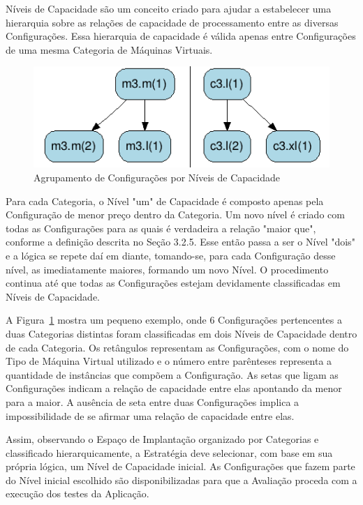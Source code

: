 Níveis de Capacidade são um conceito criado para ajudar a estabelecer uma hierarquia 
sobre as relações de capacidade de processamento entre as diversas Configurações. 
Essa hierarquia de capacidade é válida apenas entre Configurações de uma mesma 
Categoria de Máquinas Virtuais. 

\begin{figure}[hbt]
  \caption{\label{fig_niveis_capacidade}Agrupamento de Configurações por Níveis de Capacidade}
  \begin{center}
    \includegraphics{img/exemplo-niveis-capacidade}
  \end{center}
\end{figure}

Para cada Categoria, o Nível "um" de Capacidade é composto apenas pela Configuração 
de menor preço dentro da Categoria. Um novo nível é criado com todas as Configurações 
para as quais é verdadeira a relação "maior que", conforme a definição descrita 
no Seção 3.2.5. Esse então passa a ser o Nível "dois" e a lógica se repete daí em diante, 
tomando-se, para cada Configuração desse nível, as imediatamente maiores, 
formando um novo Nível. O procedimento continua até que todas as Configurações 
estejam devidamente classificadas em Níveis de Capacidade.

A Figura~\ref{fig_niveis_capacidade} mostra um pequeno exemplo, onde 6 Configurações
pertencentes a duas Categorias distintas foram classificadas em dois Níveis de 
Capacidade dentro de cada Categoria. Os retângulos representam as Configurações, 
com o nome do Tipo de Máquina Virtual utilizado e o número entre parênteses 
representa a quantidade de instâncias que compõem a Configuração. As setas que 
ligam as Configurações indicam a relação de capacidade entre elas apontando da 
menor para a maior. A ausência de seta entre duas Configurações implica a 
impossibilidade de se afirmar uma relação de capacidade entre elas. 

Assim, observando o Espaço de Implantação organizado por Categorias e classificado
hierarquicamente, a Estratégia deve selecionar, com base em sua própria lógica, um
Nível de Capacidade inicial. As Configurações que fazem parte do Nível inicial 
escolhido são disponibilizadas para que a Avaliação proceda com a execução dos 
testes da Aplicação.


